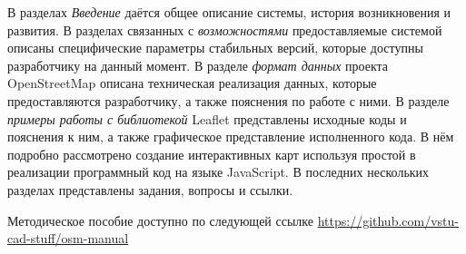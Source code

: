 \documentclass[a4paper, 14pt]{extreport}
\begin{document}
    В разделах \emph{Введение} даётся общее описание системы, история возникновения и развития. В разделах 
    связанных с \emph{возможностями} предоставляемые системой описаны специфические параметры стабильных 
    версий, которые доступны разработчику на данный момент. В разделе \emph{формат данных} проекта 
    OpenStreetMap описана техническая реализация данных, которые предоставляются разработчику, а также 
    пояснения по работе с ними. В разделе \emph{примеры работы с библиотекой} Leaflet представлены исходные 
    коды и пояснения к ним, а также графическое представление исполненного кода. В нём подробно рассмотрено 
    создание интерактивных карт используя простой в реализации программный код на языке JavaScript. 
    В последних нескольких разделах представлены задания, вопросы и ссылки.

    Методическое пособие доступно по следующей ссылке \url{https://github.com/vstu-cad-stuff/osm-manual}
\end{document}
